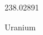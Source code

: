\documentclass[12pt]{article}
\begin{document}
\hfill{}
\vfill
\begin{center}
  {\fontsize{50}{60}
  }

  \vspace{1em}

  238.02891

Uranium
\end{center}
\vfill
\end{document}
